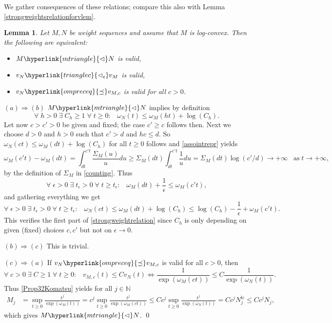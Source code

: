 \documentclass[10pt]{amsart}%
\numberwithin{equation}{section}
\theoremstyle{plain}
\newtheorem{lemma}[proposition]{Lemma}
\newcommand{\NN}{\mathbb{N}}
\let\on=\operatorname
\begin{document}
We gather consequences of these relations; compare this also with Lemma \ref{strongweightsrelationforvlem}.

\begin{lemma}\label{charactabstractweightcor}
	Let $M,N$ be weight sequences and assume that $M$ is log-convex. Then the following are equivalent:
	\begin{itemize}
		\item[$(a)$] $M\hyperlink{mtriangle}{\vartriangleleft}N$ is valid,
		
		\item[$(b)$] $v_N\hyperlink{trianglec}{\vartriangleleft_{\mathfrak{c}}}v_M$ is valid,
		
		\item[$(c)$] $v_N\hyperlink{ompreceq}{\preceq}v_{M,c}$ is valid for all $c>0$.
	\end{itemize}
\end{lemma}

$(a)\Rightarrow(b)$ $M\hyperlink{mtriangle}{\vartriangleleft}N$ implies by definition
\begin{equation}\label{charactabstractweightcorequ}
	\forall\;h>0\;\exists\;C_h\ge 1\;\forall\;t\ge 0:\;\;\;\omega_N(t)\le\omega_M(ht)+\log(C_h).
\end{equation}
Let now $c>c'>0$ be given and fixed; the case $c'\ge c$ follows then. Next we choose $d>0$ and $h>0$ such that $c'>d$ and $hc\le d$. So $\omega_N(ct)\le\omega_M(dt)+\log(C_h)$ for all $t\ge 0$ follows and \eqref{assointrepr} yields
$$\omega_M(c't)-\omega_M(dt)=\int_{dt}^{c't}\frac{\Sigma_M(u)}{u}du\ge\Sigma_M(dt)\int_{dt}^{c't}\frac{1}{u}du=\Sigma_M(dt)\log(c'/d)\rightarrow+\infty\;\;\;\text{as}\;t\rightarrow+\infty,$$
by the definition of $\Sigma_M$ in \eqref{counting}. Thus
$$\forall\;\epsilon>0\;\exists\;t_{\epsilon}>0\;\forall\;t\ge t_{\epsilon}:\;\;\;\omega_M(dt)+\frac{1}{\epsilon}\le\omega_M(c't),$$
and gathering everything we get
$$\forall\;\epsilon>0\;\exists\;t_{\epsilon}>0\;\forall\;t\ge t_{\epsilon}:\;\;\;\omega_N(ct)\le\omega_M(dt)+\log(C_h)\le\log(C_h)-\frac{1}{\epsilon}+\omega_M(c't).$$
This verifies the first part of \eqref{strongweightrelation} since $C_h$ is only depending on given (fixed) choices $c,c'$ but not on $\epsilon\rightarrow 0$.\vspace{6pt}

$(b)\Rightarrow(c)$ This is trivial.\vspace{6pt}

$(c)\Rightarrow(a)$ If $v_N\hyperlink{ompreceq}{\preceq}v_{M,c}$ is valid for all $c>0$, then
$$\forall\;c>0\;\exists\;C\ge 1\;\forall\;t\ge 0:\;\;\; v_{M,c}(t)\le Cv_N(t)\Leftrightarrow\frac{1}{\exp(\omega_M(ct))}\le C\frac{1}{\exp(\omega_N(t))}.$$
Thus \eqref{Prop32Komatsu} yields for all $j\in\NN$
\begin{align*}
	M_j&=\sup_{t\ge 0}\frac{t^j}{\exp(\omega_M(t))}=c^j\sup_{t\ge 0}\frac{t^j}{\exp(\omega_M(ct))}\le Cc^j\sup_{t\ge 0}\frac{t^j}{\exp(\omega_N(t))}=Cc^jN^{\on{lc}}_j\le Cc^jN_j,
\end{align*}
which gives $M\hyperlink{mtriangle}{\vartriangleleft}N$.
\qed\enddemo
\end{document}
